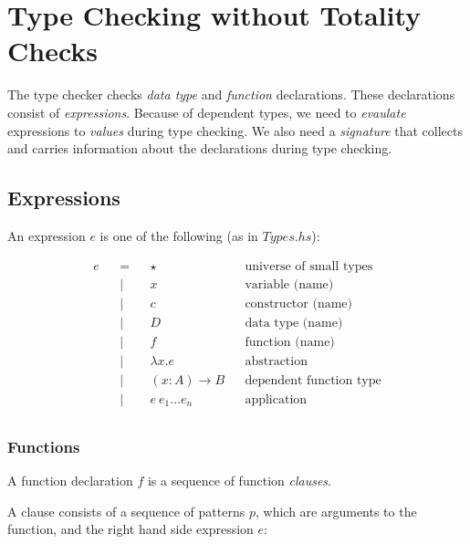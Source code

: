 \section{Type Checking without Totality Checks}
\label{sec:prelim}
The type checker checks \emph{data type} and \emph{function} declarations. These declarations
consist of \emph{expressions}. Because of dependent types, we need to \emph{evaulate} expressions to \emph{values} during type checking. We also need a \emph{signature} that collects and carries information about the declarations during type checking.

\subsection{Expressions}

An expression $e$ is one of the following (as in $Types.hs$):

\begin{equation*}
  \begin{aligned}
    e &  & = &  & \star              &  & \textrm{universe of small types} \\
      &  & | &  & x                  &  & \textrm{variable (name)}         \\
      &  & | &  & c                  &  & \textrm{constructor (name)}      \\
      &  & | &  & D                  &  & \textrm{data type (name)}        \\
      &  & | &  & f                  &  & \textrm{function (name)}         \\
      &  & | &  & \lambda x.e        &  & \textrm{abstraction}             \\
      &  & | &  & (x:A) \to B        &  & \textrm{dependent function type} \\
      &  & | &  & e \: e_1 \dots e_n &  & \textrm{application}             \\
  \end{aligned}
\end{equation*}

\subsubsection{Functions}

A function declaration $f$ is a sequence of function \emph{clauses}.

A clause consists of a sequence of \textrm{patterns} $p$, which are
arguments to the function, and the right hand side expression $e$:

